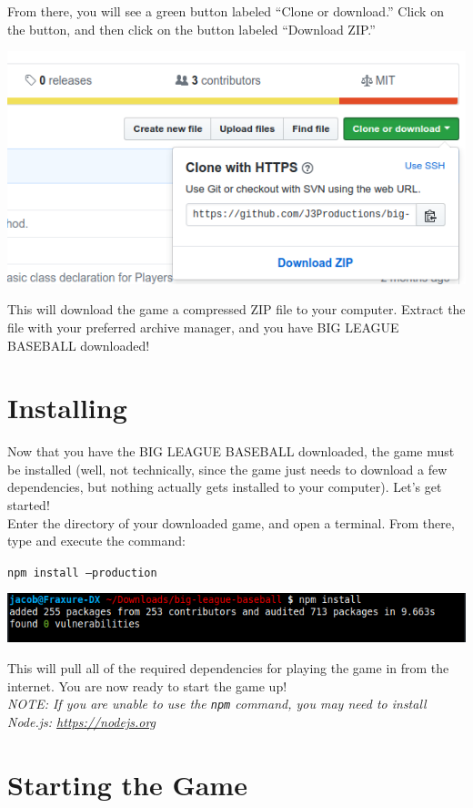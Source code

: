 \documentclass[12pt,a4paper]{report}
\begin{document}
From there, you will see a green button labeled ``Clone or download.'' Click on the button, and then click on the button labeled ``Download ZIP.''
\begin{center}
	\includegraphics[width=0.75\linewidth]{umInclude/download}
\end{center}
This will download the game a compressed ZIP file to your computer. Extract the file with your preferred archive manager, and you have BIG LEAGUE BASEBALL downloaded!

\section{Installing}
Now that you have the BIG LEAGUE BASEBALL downloaded, the game must be installed (well, not technically, since the game just needs to download a few dependencies, but nothing actually gets installed to your computer). Let's get started!\\
Enter the directory of your downloaded game, and open a terminal. From there, type and execute the command:
\begin{displayquote}
	\texttt{npm install --production}
\end{displayquote}
\begin{center}
	\includegraphics[width=1\linewidth]{umInclude/install}
\end{center}
This will pull all of the required dependencies for playing the game in from the internet. You are now ready to start the game up!\\
\textit{NOTE: If you are unable to use the \texttt{npm} command, you may need to install Node.js: \url{https://nodejs.org}}

\section{Starting the Game}
\end{document}

